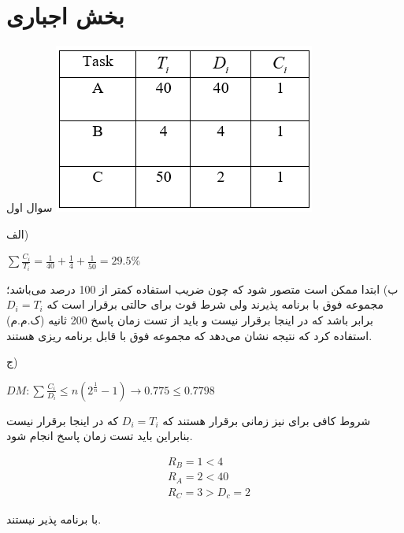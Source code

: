 \documentclass[12pt]{article}
\begin{document}
\section{بخش اجباری}
    \begin{problem}{سوال اول}
    	\centering
    	\includegraphics[scale=1]{Resources/1.png}
    	
    	\raggedright
    	الف)
    	
    	\raggedleft
    	$\sum{\frac{{{C}_{i}}}{{{T}_{i}}}}=\frac{1}{40}+\frac{1}{4}+\frac{1}{50}=29.5\%$
    	
    	\raggedright
    	ب) ابتدا ممکن است متصور شود که چون ضریب استفاده کمتر از 100 درصد می‌باشد؛ مجموعه فوق با  برنامه پذیرند ولی شرط قوث برای حالتی برقرار است که 
    	$D_i = T_i$
    	برابر باشد که در اینجا برقرار نیست و باید از تست زمان پاسخ 200 ثانیه (ک.م.م) استفاده کرد که نتیجه نشان می‌دهد که مجموعه فوق با  قابل برنامه ریزی هستند.
    	
    	ج)
    	
    	\raggedleft
    	$
    	DM : \sum{\frac{{{C}_{i}}}{{{D}_{i}}}}\le n({{2}^{\frac{1}{n}}}-1)\to 0.775\le 0.7798
    	$
    	
    	
    	\raggedright
    	شروط کافی برای  نیز زمانی برقرار هستند که $D_i = T_i$ که در اینجا برقرار نیست بنابراین باید تست زمان پاسخ انجام شود.
    	
    	\raggedleft
    	
    	\begin{align}
    	\nonumber
    		&R_B = 1 < 4\\ \nonumber
    		&R_A = 2 < 40\\  \nonumber
    		&R_C = 3 > D_c =2
    	\end{align}
    	
    	\raggedright
    	با  برنامه پذیر نیستند.
    	
    	
    	
    	
    \end{problem}
    
\end{document}
